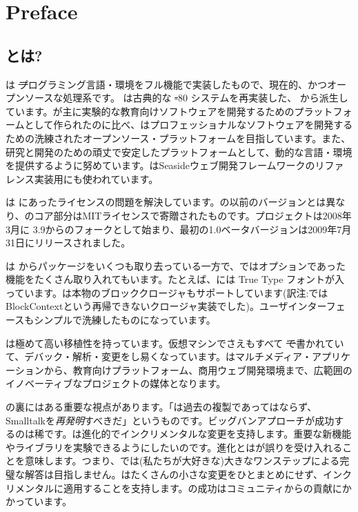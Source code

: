 \documentclass[a4paper,10pt,twoside]{book}
\begin{document}
	\sloppy
	\frontmatter
\fi
\chapter{Preface}

\section*{\pharo とは?}

\pharo は \st プログラミング言語・環境をフル機能で実装したもので、現在的、かつオープンソースな処理系です。 \pharo は古典的な \st-80 システムを再実装した、 \squeak\cite{Inga97a}から派生しています。\squeak が主に実験的な教育向けソフトウェアを開発するためのプラットフォームとして作られたのに比べ、\pharo はプロフェッショナルなソフトウェアを開発するための洗練されたオープンソース・プラットフォームを目指しています。また、研究と開発のための頑丈で安定したプラットフォームとして、動的な言語・環境を提供するように努めています。\pharo はSeasideウェブ開発フレームワークのリファレンス実装用にも使われています。

\pharo は \squeak にあったライセンスの問題を解決しています。\squeak の以前のバージョンとは異なり、\pharo のコア部分はMITライセンスで寄贈されたものです。\pharo プロジェクトは2008年3月に \squeak 3.9からのフォークとして始まり、最初の1.0ベータバージョンは2009年7月31日にリリースされました。

\pharo は \squeak からパッケージをいくつも取り去っている一方で、\squeak ではオプションであった機能をたくさん取り入れてもいます。たとえば、\pharo には True Type フォントが入っています。\pharo は本物のブロッククロージャもサポートしています(訳注:\squeak ではBlockContextという再帰できないクロージャ実装でした)。ユーザインターフェースもシンプルで洗練したものになっています。

\pharo は極めて高い移植性を持っています。仮想マシンでさえもすべて \st で書かれていて、デバック・解析・変更をし易くなっています。\pharo はマルチメディア・アプリケーションから、教育向けプラットフォーム、商用ウェブ開発環境まで、広範囲のイノベーティブなプロジェクトの媒体となります。

\pharo の裏にはある重要な視点があります。「\pharo は過去の複製であってはならず、Smalltalkを\emph{再発明}すべきだ」というものです。ビッグバンアプローチが成功するのは稀です。\pharo は進化的でインクリメンタルな変更を支持します。重要な新機能やライブラリを実験できるようにしたいのです。進化とは\pharo が誤りを受け入れることを意味します。つまり、\pharo では(私たちが大好きな)大きなワンステップによる完璧な解答は目指しません。\pharo はたくさんの小さな変更をひとまとめにせず、インクリメンタルに適用することを支持します。\pharo の成功はコミュニティからの貢献にかかっています。
\end{document}
